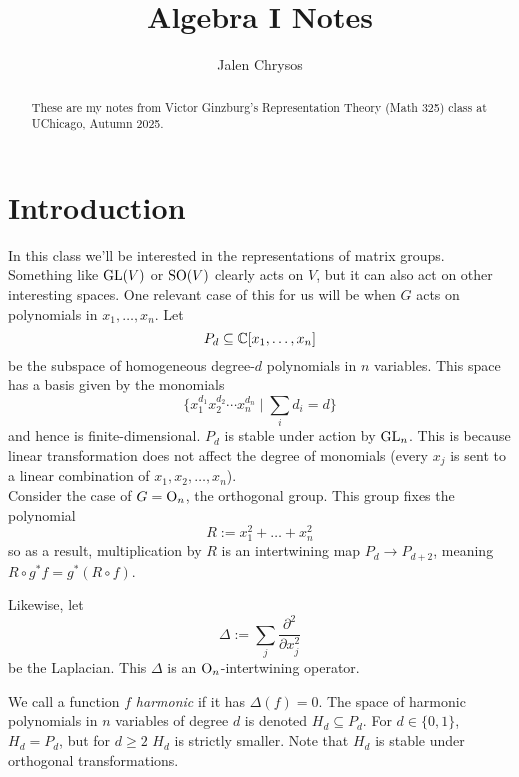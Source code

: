 \documentclass{amsart}
\title{Algebra I Notes}
\author{Jalen Chrysos}
\begin{document}
\maketitle
\begin{abstract}
	These are my notes from Victor Ginzburg's Representation Theory (Math 325) class at UChicago, Autumn 2025.
\end{abstract}

\tableofcontents

\newpage

\section{Introduction}


In this class we'll be interested in the representations of matrix groups. Something like $\operatorname{GL}(V)$ or $\operatorname{SO}(V)$ clearly acts on $V$, but it can also act on other interesting spaces. One relevant case of this for us will be when $G$ acts on polynomials in $x_1,\dots,x_n$. Let 
$$
P_d \subseteq \mathbb{C}[x_1,\dots,x_n]
$$
be the subspace of homogeneous degree-$d$ polynomials in $n$ variables. This space has a basis given by the monomials
$$
\big\{x_1^{d_1}x_2^{d_2}\cdots x_n^{d_n} \; | \; \sum_i d_i = d\big\}
$$
and hence is finite-dimensional. $P_d$ is stable under action by $\operatorname{GL}_n$. This is because linear transformation does not affect the degree of monomials (every $x_j$ is sent to a linear combination of $x_1,x_2,\dots,x_n$).\\

Consider the case of $G=\mathrm{O}_n$, the orthogonal group. This group fixes the polynomial 
$$R:=x_1^2+\dots+x_n^2$$
so as a result, multiplication by $R$ is an intertwining map $P_d\to P_{d+2}$, meaning $R\circ g^*f = g^*(R\circ f)$.

Likewise, let
$$
\Delta := \sum_j \frac{\partial^2}{\partial x_j^2}
$$
be the Laplacian. This $\Delta$ is an $\mathrm{O}_n$-intertwining operator.

We call a function $f$ \textit{harmonic} if it has $\Delta(f)=0$. The space of harmonic polynomials in $n$ variables of degree $d$ is denoted $H_d\subseteq P_d$. For $d\in \{0,1\}$, $H_d=P_d$, but for $d\geq 2$ $H_d$ is strictly smaller. Note that $H_d$ is stable under orthogonal transformations.\\
\end{document}

